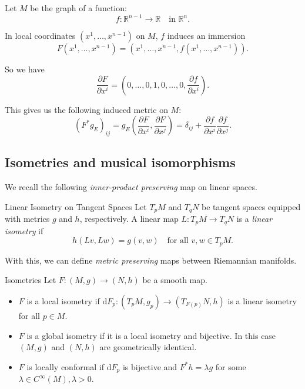 \begin{colexample}{}{}
Let \(M\) be the graph of a function:
\[
f: \mathbb{R}^{n-1} \to \mathbb{R} \quad \text{in } \mathbb{R}^n.
\]

In local coordinates \((x^1, \dots, x^{n-1})\) on \(M\), \(f\) induces an immersion
\[
F(x^1, \dots, x^{n-1}) = (x^1, \dots, x^{n-1}, f(x^1, \dots, x^{n-1})).
\]

So we have
\[
\frac{\partial F}{\partial x^i} = (0, \dots, 0, 1, 0, \dots, 0, \frac{\partial f}{\partial x^i}).
\]

This gives us the following induced metric on \(M\):
\[
(F^*g_E)_{ij} = g_E\left(\frac{\partial F}{\partial x^i}, \frac{\partial F}{\partial x^j}\right) = \delta_{ij} + \frac{\partial f}{\partial x^i} \frac{\partial f}{\partial x^j}.
\]
\end{colexample}



\subsection{Isometries and musical isomorphisms}

We recall the following \emph{inner-product preserving} map on linear spaces.

\begin{colordef}{Linear Isometry on Tangent Spaces}{}
Let \(T_pM\) and \(T_qN\) be tangent spaces equipped with metrics \(g\) and \(h\), respectively. A linear map $L: T_pM \to T_qN$ is a \emph{linear isometry} if
\[
h(Lv, Lw) = g(v,w)
\quad \text{for all } v,w \in T_pM.
\]
\end{colordef}

With this, we can define \emph{metric preserving} maps between Riemannian manifolds.


\begin{colordef}{Isometries}{}
Let \(F: (M, g) \to (N, h)\) be a smooth map.

\begin{itemize}
    \item \(F\) is a local isometry if \(\mathrm{d}F_p: (T_pM, g_p) \to (T_{F(p)}N, h)\) is a linear isometry for all \(p \in M\).
    \item \(F\) is a global isometry if it is a local isometry and bijective. In this case $(M,g)$ and $(N,h)$ are geometrically identical.
    \item \(F\) is locally conformal if \(\mathrm{d}F_p\) is bijective and \(F^*h = \lambda g\) for some \(\lambda \in C^\infty(M), \lambda > 0\).
\end{itemize}
\end{colordef}


